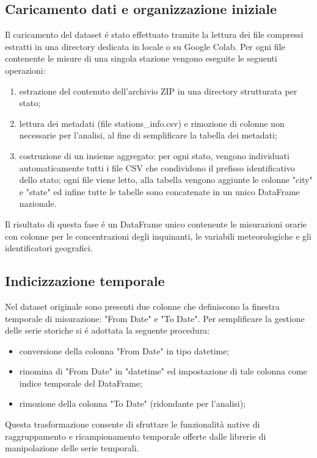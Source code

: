 \documentclass[a4paper,12pt]{report}
\begin{document}
	\subsection{Caricamento dati e organizzazione iniziale}
	Il caricamento del dataset é stato effettuato tramite la lettura dei file compressi estratti in una directory dedicata in locale o su Google Colab. Per ogni file contenente le misure di una singola stazione vengono eseguite le seguenti operazioni:
	
	\begin{enumerate}
		\item estrazione del contenuto dell'archivio ZIP in una directory strutturata per stato;
		\item lettura dei metadati (file stations\_info.csv) e rimozione di colonne non necessarie per l'analisi, al fine di semplificare la tabella dei metadati;
		\item costruzione di un insieme aggregato: per ogni stato, vengono individuati automaticamente tutti i file CSV che condividono il prefisso identificativo dello stato; ogni file viene letto, alla tabella vengono aggiunte le colonne "city" e "state" ed infine tutte le tabelle sono concatenate in un unico DataFrame nazionale.
	\end{enumerate}
	
	Il risultato di questa fase é un DataFrame unico contenente le misurazioni orarie con colonne per le concentrazioni degli inquinanti, le variabili meteorologiche e gli identificatori geografici.
	
	\subsection{Indicizzazione temporale}
	Nel dataset originale sono presenti due colonne che definiscono la finestra temporale di misurazione: "From Date" e "To Date". Per semplificare la gestione delle serie storiche si é adottata la seguente procedura:
	\begin{itemize}
		\item conversione della colonna "From Date" in tipo datetime;
		\item rinomina di "From Date" in "datetime" ed impostazione di tale colonna come indice temporale del DataFrame;
		\item rimozione della colonna "To Date" (ridondante per l'analisi);
	\end{itemize}
	Questa trasformazione consente di sfruttare le funzionalità native di raggruppamento e ricampionamento temporale offerte dalle librerie di manipolazione delle serie temporali.
	
\end{document}
